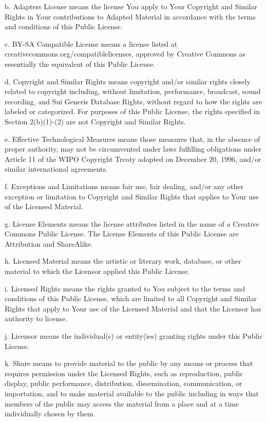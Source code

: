b. Adapter\textquotesingle{}s License means the license You apply to Your Copyright and Similar Rights in Your contributions to Adapted Material in accordance with the terms and conditions of this Public License.

c. B\+Y-\/\+SA Compatible License means a license listed at creativecommons.\+org/compatiblelicenses, approved by Creative Commons as essentially the equivalent of this Public License.

d. Copyright and Similar Rights means copyright and/or similar rights closely related to copyright including, without limitation, performance, broadcast, sound recording, and Sui Generis Database Rights, without regard to how the rights are labeled or categorized. For purposes of this Public License, the rights specified in Section 2(b)(1)-\/(2) are not Copyright and Similar Rights.

e. Effective Technological Measures means those measures that, in the absence of proper authority, may not be circumvented under laws fulfilling obligations under Article 11 of the W\+I\+PO Copyright Treaty adopted on December 20, 1996, and/or similar international agreements.

f. Exceptions and Limitations means fair use, fair dealing, and/or any other exception or limitation to Copyright and Similar Rights that applies to Your use of the Licensed Material.

g. License Elements means the license attributes listed in the name of a Creative Commons Public License. The License Elements of this Public License are Attribution and Share\+Alike.

h. Licensed Material means the artistic or literary work, database, or other material to which the Licensor applied this Public License.

i. Licensed Rights means the rights granted to You subject to the terms and conditions of this Public License, which are limited to all Copyright and Similar Rights that apply to Your use of the Licensed Material and that the Licensor has authority to license.

j. Licensor means the individual(s) or entity(ies) granting rights under this Public License.

k. Share means to provide material to the public by any means or process that requires permission under the Licensed Rights, such as reproduction, public display, public performance, distribution, dissemination, communication, or importation, and to make material available to the public including in ways that members of the public may access the material from a place and at a time individually chosen by them.


